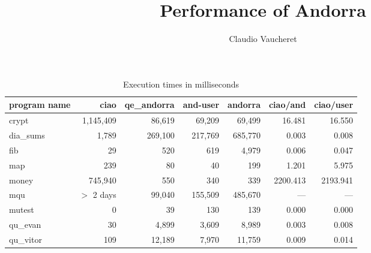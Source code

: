 \documentclass[12pt]{article}
\title{Performance of Andorra}
\author{Claudio Vaucheret}
\begin{document}
\maketitle

\begin{table}[htbp]
  \begin{center}
    \begin{tabular}{||l||r||r|r|r|r|r||} \hline \hline
        program name & ciao & qe\_andorra & and-user & andorra & ciao/and & ciao/user \\ \hline \hline 
                       crypt & 1,145,409 & 86,619 & 69,209 & 69,499 & 16.481 & 16.550 \\ \hline dia\_sums & 1,789 & 269,100 & 217,769 & 685,770 & 0.003 & 0.008 \\ \hline fib & 29 & 520 & 619 & 4,979 & 0.006 & 0.047 \\ \hline map & 239 & 80 & 40 & 199 & 1.201 & 5.975 \\ \hline money & 745,940 & 550 & 340 & 339 & 2200.413 & 2193.941 \\ \hline mqu & $>$ 2 days & 99,040 & 155,509 & 485,670 & ---  & --- \\ \hline mutest & 0 & 39 & 130 & 139 & 0.000 & 0.000 \\ \hline qu\_evan & 30 & 4,899 & 3,609 & 8,989 & 0.003 & 0.008 \\ \hline qu\_vitor & 109 & 12,189 & 7,970 & 11,759 & 0.009 & 0.014 \\ \hline 
        \hline 
    \end{tabular}
    \caption{Execution times in milliseconds}
    
  \end{center}
\end{table}
\end{document}
